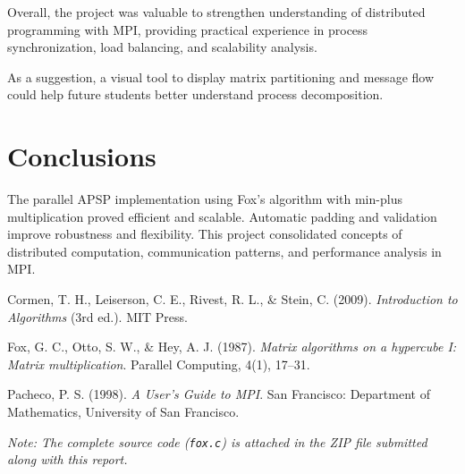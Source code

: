 \documentclass[10pt,a4paper]{article}
\begin{document}
Overall, the project was valuable to strengthen understanding of distributed programming with MPI, providing practical experience in process synchronization, load balancing, and scalability analysis.
 
As a suggestion, a visual tool to display matrix partitioning and message flow could help future students better understand process decomposition.

\section{Conclusions}
The parallel APSP implementation using Fox’s algorithm with min-plus multiplication proved efficient and scalable.  
Automatic padding and validation improve robustness and flexibility.  
This project consolidated concepts of distributed computation, communication patterns, and performance analysis in MPI.

\begin{thebibliography}{9}
Cormen, T. H., Leiserson, C. E., Rivest, R. L., \& Stein, C. (2009).
\textit{Introduction to Algorithms} (3rd ed.).
MIT Press.

Fox, G. C., Otto, S. W., \& Hey, A. J. (1987).
\textit{Matrix algorithms on a hypercube I: Matrix multiplication}.
Parallel Computing, 4(1), 17–31.

Pacheco, P. S. (1998).
\textit{A User's Guide to MPI}.
San Francisco: Department of Mathematics, University of San Francisco.
  \end{thebibliography}

\vspace{0.3cm}
  
\textit{Note: The complete source code (\texttt{fox.c}) is attached in the ZIP file submitted along with this report.}
\end{document}
